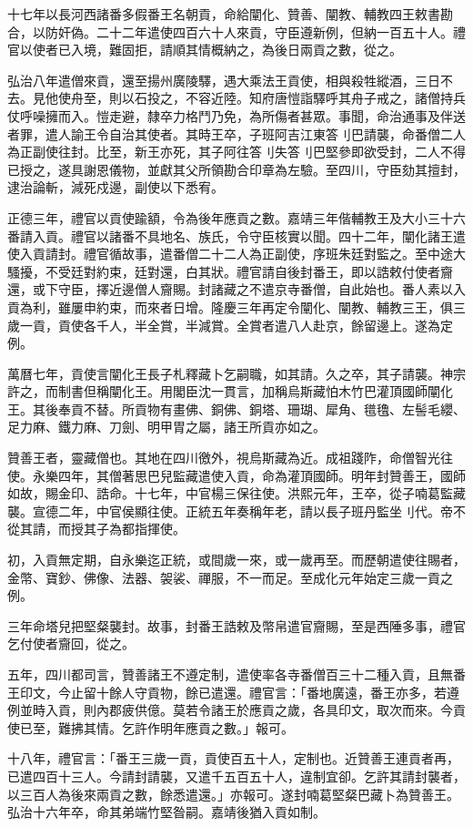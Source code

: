 \begin{pinyinscope}
十七年以長河西諸番多假番王名朝貢，命給闡化、贊善、闡教、輔教四王敕書勘合，以防奸偽。二十二年遣使四百六十人來貢，守臣遵新例，但納一百五十人。禮官以使者已入境，難固拒，請順其情概納之，為後日兩貢之數，從之。

弘治八年遣僧來貢，還至揚州廣陵驛，遇大乘法王貢使，相與殺牲縱酒，三日不去。見他使舟至，則以石投之，不容近陸。知府唐愷詣驛呼其舟子戒之，諸僧持兵仗呼噪擁而入。愷走避，隸卒力格鬥乃免，為所傷者甚眾。事聞，命治通事及伴送者罪，遣人諭王令自治其使者。其時王卒，子班阿吉江東答刂巴請襲，命番僧二人為正副使往封。比至，新王亦死，其子阿往答刂失答刂巴堅參即欲受封，二人不得已授之，遂具謝恩儀物，並獻其父所領勘合印章為左驗。至四川，守臣劾其擅封，逮治論斬，減死戍邊，副使以下悉宥。

正德三年，禮官以貢使踰額，令為後年應貢之數。嘉靖三年偕輔教王及大小三十六番請入貢。禮官以諸番不具地名、族氏，令守臣核實以聞。四十二年，闡化諸王遣使入貢請封。禮官循故事，遣番僧二十二人為正副使，序班朱廷對監之。至中途大騷擾，不受廷對約束，廷對還，白其狀。禮官請自後封番王，即以誥敕付使者齎還，或下守臣，擇近邊僧人齎賜。封諸藏之不遣京寺番僧，自此始也。番人素以入貢為利，雖屢申約束，而來者日增。隆慶三年再定令闡化、闡教、輔教三王，俱三歲一貢，貢使各千人，半全賞，半減賞。全賞者遣八人赴京，餘留邊上。遂為定例。

萬曆七年，貢使言闡化王長子札釋藏卜乞嗣職，如其請。久之卒，其子請襲。神宗許之，而制書但稱闡化王。用閣臣沈一貫言，加稱烏斯藏怕木竹巴灌頂國師闡化王。其後奉貢不替。所貢物有畫佛、銅佛、銅塔、珊瑚、犀角、氆氌、左髻毛纓、足力麻、鐵力麻、刀劍、明甲胃之屬，諸王所貢亦如之。

贊善王者，靈藏僧也。其地在四川徼外，視烏斯藏為近。成祖踐阼，命僧智光往使。永樂四年，其僧著思巴兒監藏遣使入貢，命為灌頂國師。明年封贊善王，國師如故，賜金印、誥命。十七年，中官楊三保往使。洪熙元年，王卒，從子喃葛監藏襲。宣德二年，中官侯顯往使。正統五年奏稱年老，請以長子班丹監坐刂代。帝不從其請，而授其子為都指揮使。

初，入貢無定期，自永樂迄正統，或間歲一來，或一歲再至。而歷朝遣使往賜者，金幣、寶鈔、佛像、法器、袈裟、禪服，不一而足。至成化元年始定三歲一貢之例。

三年命塔兒把堅粲襲封。故事，封番王誥敕及幣帛遣官齎賜，至是西陲多事，禮官乞付使者齎回，從之。

五年，四川都司言，贊善諸王不遵定制，遣使率各寺番僧百三十二種入貢，且無番王印文，今止留十餘人守貢物，餘已遣還。禮官言：「番地廣遠，番王亦多，若遵例並時入貢，則內郡疲供億。莫若令諸王於應貢之歲，各具印文，取次而來。今貢使已至，難拂其情。乞許作明年應貢之數。」報可。

十八年，禮官言：「番王三歲一貢，貢使百五十人，定制也。近贊善王連貢者再，已遣四百十三人。今請封請襲，又遣千五百五十人，違制宜卻。乞許其請封襲者，以三百人為後來兩貢之數，餘悉遣還。」亦報可。遂封喃葛堅粲巴藏卜為贊善王。弘治十六年卒，命其弟端竹堅昝嗣。嘉靖後猶入貢如制。


\end{pinyinscope}
